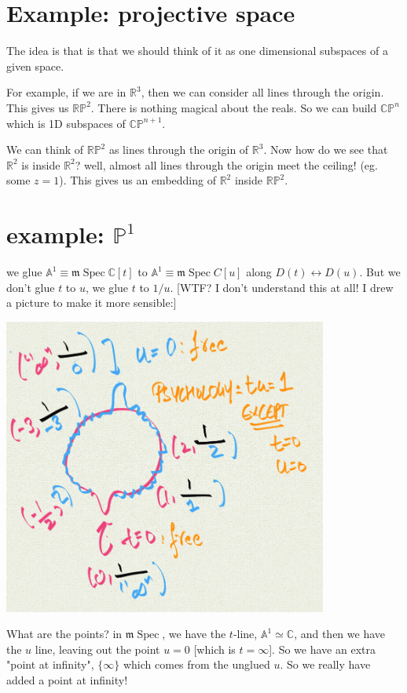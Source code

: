 \documentclass{book}
\newcommand{\C}{\ensuremath{\mathbb{C}}}
\newcommand{\R}{\ensuremath{\mathbb{R}}}
\newcommand{\CP}{\ensuremath{\mathbb{CP}}}
\renewcommand{\P}{\ensuremath{\mathbb{P}}}
\newcommand{\A}{\ensuremath{\mathbb{A}}}
\newcommand{\RP}{\ensuremath{\mathbb{RP}}}
\newcommand{\m}{\mathfrak{m}}
\newcommand{\mSpec}{\m\operatorname{Spec}}
\newcommand{\mspec}{\m\operatorname{Spec}}
\theoremstyle{definition}
\begin{document}
\section{Example: projective space}
The idea is that is that we should think of it as one dimensional subspaces
of a given space.

For example, if we are in $\R^3$, then we can consider all lines through
the origin. This gives us $\RP^2$. There is nothing magical about the reals.
So we can build $\CP^n$ which is 1D subspaces of $\CP^{n+1}$.

We can think of $\RP^2$ as lines through the origin of $\R^3$. Now how do
we see that $\R^2$ is inside $\R^2$? well, almost all lines through the
origin meet the ceiling! (eg. some $z = 1$). This gives us an embedding
of $\R^2$ inside $\RP^2$.

\section{example: $\P^1$}

we glue $\A^1 \equiv \mSpec \C[t]$ to $\A^1 \equiv \mSpec C[u]$ along
$D(t) \leftrightarrow D(u)$. But we don't glue $t$ to $u$, we glue $t$ to $1/u$.
[WTF? I don't understand this at all! I drew a picture to make it more
sensible:]


\includegraphics[width=0.8\textwidth]{projective-space-glued.png}


What are the points? in $\mspec$, we have the $t$-line, $\A^1 \simeq \C$,
and then we have the $u$ line, leaving out the point $u = 0$ [which is $t = \infty$].
So we have an extra "point at infinity", $\{ \infty \}$ which comes from
the unglued $u$. So we really have added a point at infinity!
\end{document}
